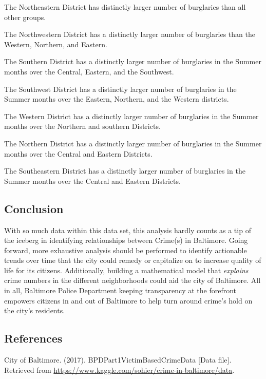 \documentclass{article}
\newlength\tindent
\renewcommand{\indent}{\hspace*{\tindent}}
\begin{document}
\begin{enumerate}

{\setlength\itemindent{25pt}\item The Northeastern District has distinctly larger number of burglaries than all other groups.}
{\setlength\itemindent{25pt}\item The Northwestern District has a distinctly larger number of burglaries than the Western, Northern, and Eastern.}
{\setlength\itemindent{25pt}\item The Southern District has a distinctly larger number of burglaries in the Summer months over the Central, Eastern, and the Southwest.}
{\setlength\itemindent{25pt}\item The Southwest District has a distinctly larger number of burglaries in the Summer months over the Eastern, Northern, and the Western districts.  }
{\setlength\itemindent{25pt}\item The Western District has a distinctly larger number of burglaries in the Summer months over the Northern and southern Districts.}
{\setlength\itemindent{25pt}\item The Northern District has a distinctly larger number of burglaries in the Summer months over the Central and Eastern Districts. } 
{\setlength\itemindent{25pt}\item The Southeastern District has a distinctly larger number of burglaries in the Summer months over the Central and Eastern Districts.}
\end{enumerate} 


 

\subsection*{Conclusion}
\indent With so much data within this data set, this analysis hardly counts as a tip of the iceberg in identifying relationships between Crime(s) in Baltimore.  Going forward, more exhaustive analysis should be performed to identify actionable trends over time that the city could remedy or capitalize on to increase quality of life for its citizens.  Additionally, building a mathematical model that \textit{explains} crime numbers in the different neighborhoods could aid the city of Baltimore.  All in all, Baltimore Police Department keeping transparency at the forefront empowers citizens in and out of Baltimore to help turn around crime's hold on the city's residents.  


\subsection*{References}
City of Baltimore. (2017). BPDPart1VictimBasedCrimeData [Data file].  Retrieved from \url{https://www.kaggle.com/sohier/crime-in-baltimore/data}.  


\end{document}
